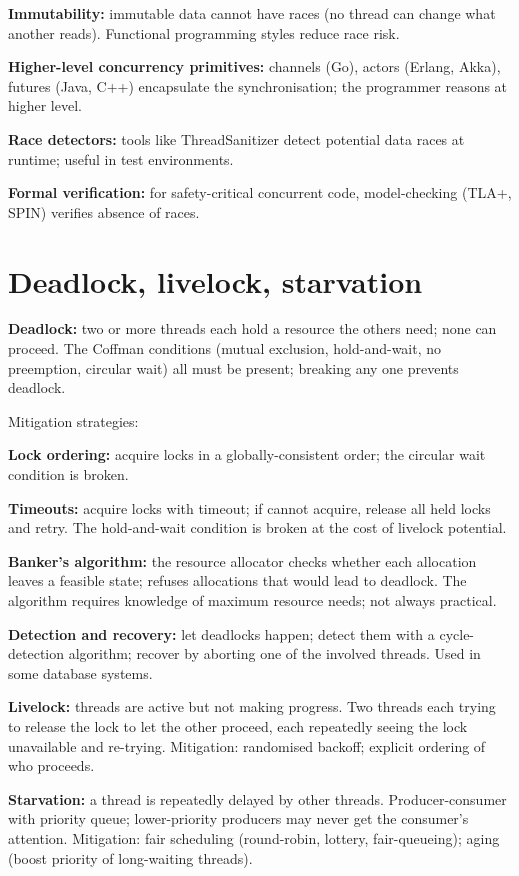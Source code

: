 \textbf{Immutability:} immutable data cannot have races (no thread can change what another reads). Functional programming styles reduce race risk.

\textbf{Higher-level concurrency primitives:} channels (Go), actors (Erlang, Akka), futures (Java, C++) encapsulate the synchronisation; the programmer reasons at higher level.

\textbf{Race detectors:} tools like ThreadSanitizer detect potential data races at runtime; useful in test environments.

\textbf{Formal verification:} for safety-critical concurrent code, model-checking (TLA+, SPIN) verifies absence of races.

\section{Deadlock, livelock, starvation}

\textbf{Deadlock:} two or more threads each hold a resource the others need; none can proceed. The Coffman conditions (mutual exclusion, hold-and-wait, no preemption, circular wait) all must be present; breaking any one prevents deadlock.

Mitigation strategies:

\textbf{Lock ordering:} acquire locks in a globally-consistent order; the circular wait condition is broken.

\textbf{Timeouts:} acquire locks with timeout; if cannot acquire, release all held locks and retry. The hold-and-wait condition is broken at the cost of livelock potential.

\textbf{Banker's algorithm:} the resource allocator checks whether each allocation leaves a feasible state; refuses allocations that would lead to deadlock. The algorithm requires knowledge of maximum resource needs; not always practical.

\textbf{Detection and recovery:} let deadlocks happen; detect them with a cycle-detection algorithm; recover by aborting one of the involved threads. Used in some database systems.

\textbf{Livelock:} threads are active but not making progress. Two threads each trying to release the lock to let the other proceed, each repeatedly seeing the lock unavailable and re-trying. Mitigation: randomised backoff; explicit ordering of who proceeds.

\textbf{Starvation:} a thread is repeatedly delayed by other threads. Producer-consumer with priority queue; lower-priority producers may never get the consumer's attention. Mitigation: fair scheduling (round-robin, lottery, fair-queueing); aging (boost priority of long-waiting threads).

